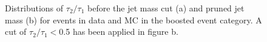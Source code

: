 \begin{figure}[hbtp]\begin{center}
 \caption{Distributions of $\tau_2/\tau_1$ before the jet mass cut (a) and pruned jet mass (b) for events in data and MC in the boosted event category. 
 A cut of $\tau_2/\tau_1<$0.5 has been applied in figure b.}
 \label{fig:boostvtagvars}\end{center}\end{figure}

